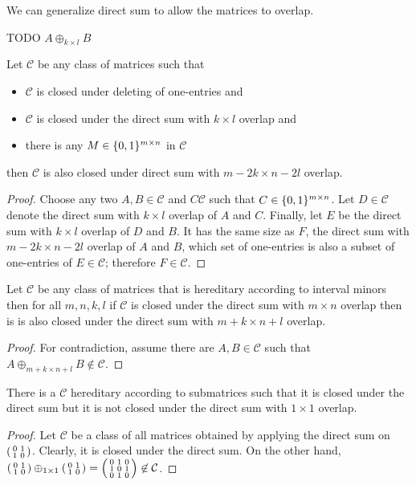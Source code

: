 We can generalize direct sum to allow the matrices to overlap.
\begin{defn}
TODO $A\oplus_{k\times l}B$
\end{defn}
\begin{thm}
Let $\mathcal{C}$ be any class of matrices such that
\begin{itemize}
\item $\mathcal{C}$ is closed under deleting of one-entries and
\item $\mathcal{C}$ is closed under the direct sum with $k\times l$ overlap and
\item there is any $M\in\{0,1\}^{m\times n}$ in $\mathcal{C}$
\end{itemize}
then $\mathcal{C}$ is also closed under direct sum with $m-2k\times n-2l$ overlap.
\end{thm}
\begin{proof}
Choose any two $A,B\in\mathcal{C}$ and $C\mathcal{C}$ such that $C\in\{0,1\}^{m\times n}$. Let $D\in\mathcal{C}$ denote the direct sum with $k\times l$ overlap of $A$ and $C$. Finally, let $E$ be the direct sum with $k\times l$ overlap of $D$ and $B$. It has the same size as $F$, the direct sum with $m-2k\times n-2l$ overlap of $A$ and $B$, which set of one-entries is also a subset of one-entries of $E\in\mathcal{C}$; therefore $F\in\mathcal{C}$.
\end{proof}
\begin{thm}
\label{hered}
Let $\mathcal{C}$ be any class of matrices that is hereditary according to interval minors then for all $m,n,k,l$ if $\mathcal{C}$ is closed under the direct sum with $m\times n$ overlap then is is also closed under the direct sum with $m+k\times n+l$ overlap.
\end{thm}
\begin{proof}
For contradiction, assume there are $A,B\in\mathcal{C}$ such that $A\oplus_{m+k\times n+l}B\not\in\mathcal{C}$.
\end{proof}
\begin{obs}
There is a $\mathcal{C}$ hereditary according to submatrices such that it is closed under the direct sum but it is not closed under the direct sum with $1\times1$ overlap.
\end{obs}
\begin{proof}
Let $\mathcal{C}$ be a class of all matrices obtained by applying the direct sum on $\left(\begin{smallmatrix}0&1\\1&0\end{smallmatrix}\right)$. Clearly, it is closed under the direct sum. On the other hand, $\left(\begin{smallmatrix}0&1\\1&0\end{smallmatrix}\right)\oplus_{1\times1}\left(\begin{smallmatrix}0&1\\1&0\end{smallmatrix}\right)=\left(\begin{smallmatrix}0&1&0\\1&0&1\\0&1&0\end{smallmatrix}\right)\not\in\mathcal{C}$.
\end{proof}
